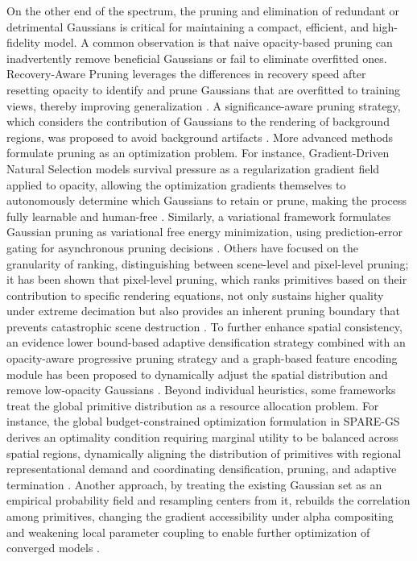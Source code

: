\documentclass[11pt]{article}
\begin{document}
On the other end of the spectrum, the pruning and elimination of redundant or detrimental Gaussians is critical for maintaining a compact, efficient, and high-fidelity model. A common observation is that naive opacity-based pruning can inadvertently remove beneficial Gaussians or fail to eliminate overfitted ones. Recovery-Aware Pruning leverages the differences in recovery speed after resetting opacity to identify and prune Gaussians that are overfitted to training views, thereby improving generalization \cite{ref124,ref42}. A significance-aware pruning strategy, which considers the contribution of Gaussians to the rendering of background regions, was proposed to avoid background artifacts \cite{ref130}. More advanced methods formulate pruning as an optimization problem. For instance, Gradient-Driven Natural Selection models survival pressure as a regularization gradient field applied to opacity, allowing the optimization gradients themselves to autonomously determine which Gaussians to retain or prune, making the process fully learnable and human-free \cite{ref131}. Similarly, a variational framework formulates Gaussian pruning as variational free energy minimization, using prediction-error gating for asynchronous pruning decisions \cite{ref132}. Others have focused on the granularity of ranking, distinguishing between scene-level and pixel-level pruning; it has been shown that pixel-level pruning, which ranks primitives based on their contribution to specific rendering equations, not only sustains higher quality under extreme decimation but also provides an inherent pruning boundary that prevents catastrophic scene destruction \cite{ref133}. To further enhance spatial consistency, an evidence lower bound-based adaptive densification strategy combined with an opacity-aware progressive pruning strategy and a graph-based feature encoding module has been proposed to dynamically adjust the spatial distribution and remove low-opacity Gaussians \cite{ref134}. Beyond individual heuristics, some frameworks treat the global primitive distribution as a resource allocation problem. For instance, the global budget-constrained optimization formulation in SPARE-GS derives an optimality condition requiring marginal utility to be balanced across spatial regions, dynamically aligning the distribution of primitives with regional representational demand and coordinating densification, pruning, and adaptive termination \cite{ref135}. Another approach, by treating the existing Gaussian set as an empirical probability field and resampling centers from it, rebuilds the correlation among primitives, changing the gradient accessibility under alpha compositing and weakening local parameter coupling to enable further optimization of converged models \cite{ref136}.
\end{document}
